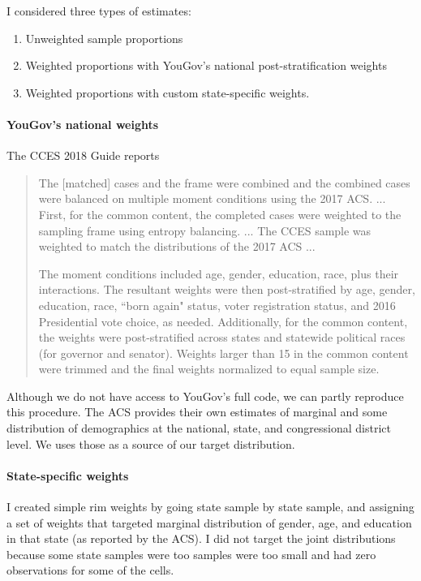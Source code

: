 \documentclass[11pt]{article}
\begin{document}
I considered three types of estimates:

\begin{enumerate}
\item Unweighted sample proportions
\item Weighted proportions with YouGov's national post-stratification weights
\item Weighted proportions with custom state-specific weights. 
\end{enumerate}

\paragraph{YouGov's national weights} The CCES 2018 Guide  reports

\begin{quote}
\singlespacing
The [matched] cases and the frame were combined and the combined cases were balanced on multiple moment conditions using the 2017 ACS.  ... First, for the common content, the completed cases were weighted to the sampling frame using entropy balancing. ... The CCES sample was weighted to match the distributions of the 2017 ACS  ... 

The moment conditions included age, gender, education, race, plus their interactions. The resultant weights were then post-stratified by age, gender, education, race, ``born again" status, voter registration status, and 2016 Presidential vote choice, as needed. Additionally, for the common content, the weights were post-stratified across states and statewide political races (for governor and senator). Weights larger than 15 in the common content were trimmed and the final weights normalized to equal sample size. 
\end{quote}

Although we do not have access to YouGov's full code, we can partly reproduce this procedure. The ACS provides their own estimates of marginal and some distribution of demographics at the national, state, and congressional district level. We uses those as a source of our target distribution.

\paragraph{State-specific weights} I created simple rim weights by going state sample by state sample, and assigning a set of weights that targeted marginal distribution of gender, age, and education in that state (as reported by the ACS). I did not target the joint distributions because some state samples were too samples were too small and had zero observations for some of the cells. 
\end{document}
